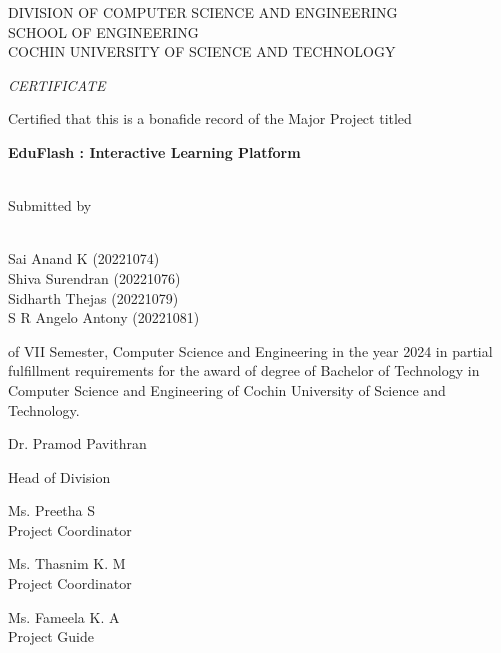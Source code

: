 \documentclass{report}
\begin{document}
\begin{center}

\LARGE
DIVISION OF COMPUTER SCIENCE AND ENGINEERING\\
SCHOOL OF ENGINEERING\\
COCHIN UNIVERSITY OF SCIENCE AND TECHNOLOGY\\

\hspace{1em}

\huge
\emph{CERTIFICATE}

\hspace{1em}

\large
Certified that this is a bonafide record of the  Major Project titled


\hspace{1em}

\Large
\begin{center}
\textbf{EduFlash : Interactive Learning Platform}

 \\
\vspace{2em}
 Submitted by
\end{center}

\hspace{1em}



\hspace{1em}
\Large
\\
Sai Anand K (20221074)\\
Shiva Surendran (20221076)\\
Sidharth Thejas (20221079)\\
S R Angelo Antony (20221081)\\
\hspace{1em}

\large
of VII Semester, Computer Science and Engineering in the year 2024 in partial fulfillment requirements for the award of degree of Bachelor of Technology in Computer Science and Engineering of Cochin University of Science and Technology.


\vspace{8em}

\begin{minipage}[b]{0.25\textwidth}
\raggedright
Dr. Pramod Pavithran \\[0pt]
\raggedright Head of Division
\end{minipage}%
\begin{minipage}[b]{0.25\textwidth}
\centering
Ms. Preetha S \\[0pt]
\centering Project Coordinator
\end{minipage}%
\begin{minipage}[b]{0.25\textwidth}
\centering
Ms. Thasnim K. M \\[0pt]
\centering Project Coordinator
\end{minipage}%
\begin{minipage}[b]{0.25\textwidth}
\raggedleft
Ms. Fameela K. A \\[0pt]
\raggedleft Project Guide
\end{minipage}









\end{center}
\end{document}
